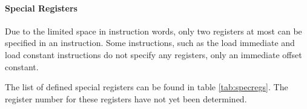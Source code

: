 

\paragraph{Special Registers}

Due to the limited space in instruction words, only two registers at most can be
specified in an instruction. Some instructions, such as the load immediate and
load constant instructions do not specify any registers, only an immediate
offset constant.

The list of defined special registers can be found in table \ref{tab:specregs}.
The register number for these registers have not yet been determined.



